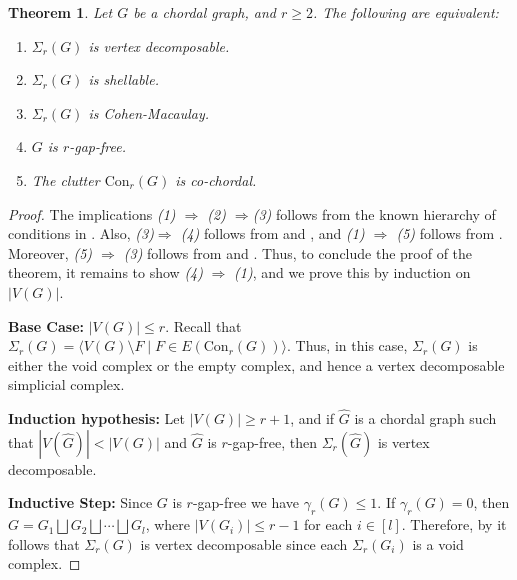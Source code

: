 \documentclass[12pt,reqno]{amsart}
\newtheorem{theorem}[proposition]{Theorem}
\theoremstyle{definition}
\newcommand{\Con}{{\mathrm{Con}}}
\def\l{\langle}
\def\r{\rangle}
\begin{document}
	\begin{theorem}\label{V.D of Sigma_r(G) if G is chordal}
		Let $G$ be a chordal graph, and $r \geq 2$. The following are equivalent:
		\begin{enumerate}        
			\item $\Sigma_r(G)$ is vertex decomposable.
			\item $\Sigma_r(G)$ is shellable.
			\item $\Sigma_r(G)$ is Cohen-Macaulay.
			\item $G$ is $r$-gap-free.
			\item The clutter $\Con_r(G)$ is co-chordal.
		\end{enumerate}
	\end{theorem}
	\begin{proof}
		The implications \emph{(1) $\Rightarrow$ (2) $\Rightarrow$(3)} follows from the known hierarchy of conditions in . Also, \emph{(3)$ \Rightarrow$ (4)} follows from \cite[Theorem 3]{EagonReiner1998} and \cite[Theorem 1.4]{HaWoodroofe2014}, and \emph{(1) $\Rightarrow$ (5)} follows from . Moreover, \emph{(5) $\Rightarrow$ (3)} follows from \cite[Theorem 3.3]{SBCC} and \cite[Theorem 3]{EagonReiner1998}. Thus, to conclude the proof of the theorem, it remains to show \emph{(4)} $\Rightarrow$ \emph{(1)}, and we prove this by induction on $|V(G)|$.  

\medskip
        \noindent
        {\bf Base Case:} $|V(G)| \leq r $. Recall that $\Sigma_{r}(G)=\l V(G)\setminus F\mid F\in E(\Con_r(G))\r$. Thus, in this case, $\Sigma_r(G) $ is either the void complex or the empty complex, and hence a vertex decomposable simplicial complex.
        
        \medskip
        \noindent
        {\bf Induction hypothesis:} Let $|V(G)|\ge r+1$, and if $\widehat G$ is a chordal graph such that $|V(\widehat G)|<|V(G)|$ and $\widehat G$ is $r$-gap-free, then $\Sigma_r(\widehat G)$ is vertex decomposable.

\medskip
        \noindent
        {\bf Inductive Step:} Since $G$ is $r$-gap-free we have $\gamma_r(G) \leq 1$. If $\gamma_r(G) = 0$, then $G = G_1 \bigsqcup G_2 \bigsqcup \cdots \bigsqcup G_l$, where $|V(G_i)| \leq r - 1$ for each $i\in[l]$. Therefore, by  it follows that $\Sigma_r(G)$ is vertex decomposable since each $\Sigma_{r}(G_i)$ is a void complex.
		

\end{proof}
\end{document}
